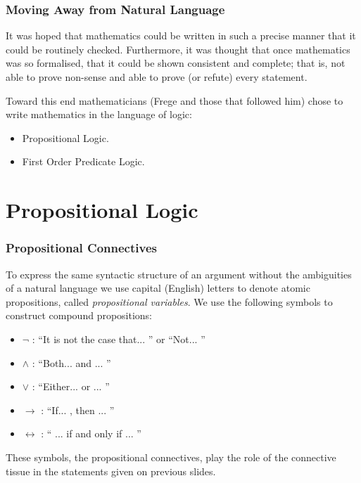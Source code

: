 \documentclass{beamer}
\begin{document}
\begin{frame}
	\frametitle{Moving Away from Natural Language}
	
	
	It was hoped that mathematics could be written in such a precise manner that it could be routinely checked. Furthermore, it was thought that once mathematics was so formalised, that it could be shown consistent and complete; that is, not able to prove non-sense and able to prove (or refute) every statement. 

	\vspace{1cm}

	Toward this end mathematicians (Frege and those that followed him) chose to write mathematics in the language of logic: 

	\begin{itemize}
		\item Propositional Logic.
		\item First Order Predicate Logic.
	\end{itemize}
	
	
\end{frame}

\section{Propositional Logic}

\begin{frame}
	\frametitle{Propositional Connectives}
	
	To express the same syntactic structure of an argument without the ambiguities of a natural language we use capital (English) letters to denote atomic propositions, called \emph{propositional variables}. We use the following symbols to construct compound propositions: 
	
	\vspace{0.5cm}
	
	\begin{itemize}
		\item $\lnot$ : ``It is not the case that... '' or ``Not... ''
		\item $\land$ : ``Both... and ... '' 
		\item $\lor$ : ``Either... or ... ''
		\item $\rightarrow$ : ``If... , then ... ''
		\item $\leftrightarrow$ : `` ... if and only if ... ''
	\end{itemize}

	These symbols, the propositional connectives, play the role of the connective tissue in the statements given on previous slides. 
	
\end{frame}
\end{document}
